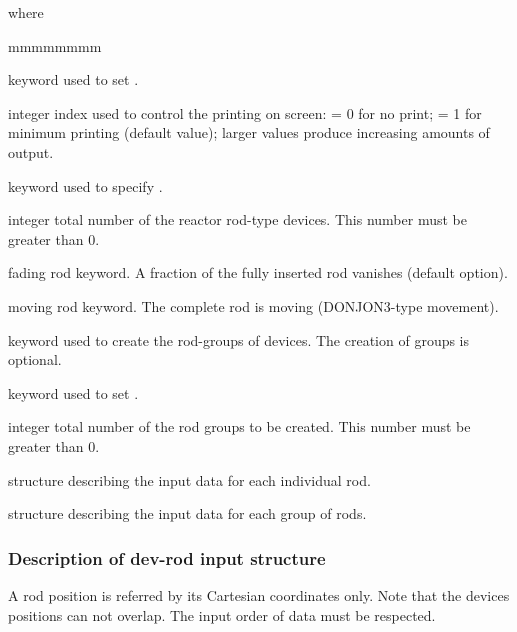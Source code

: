 \noindent where
\begin{ListeDeDescription}{mmmmmmmm}

\item[\moc{EDIT}] keyword used to set .

\item[\dusa{iprint}] integer index used to control the printing on screen:
= 0 for no print; = 1 for minimum printing (default value); larger values
produce increasing amounts of output.

\item[\moc{NUM-ROD}] keyword used to specify .

\item[\dusa{nrod}] integer total number of the reactor rod-type devices.
This number must be greater than 0.

\item[\moc{FADE}] fading rod keyword. A fraction of the fully inserted rod vanishes (default option).

\item[\moc{MOVE}] moving rod keyword. The complete rod is moving (DONJON3-type movement).

\item[\moc{CREATE}] keyword used to create the rod-groups of devices.
The creation of groups is optional.

\item[\moc{ROD-GR}] keyword used to set .

\item[\dusa{ngrp}] integer total number of the rod groups to be created.
This number must be greater than 0.

\item[\dstr{dev-rod}] structure describing the input data for each individual rod.
 
\item[\dstr{rod-group}] structure describing the input data for each group of rods.

\end{ListeDeDescription}

\vskip 0.2cm

\subsubsection{Description of dev-rod input structure}\label{sect:devrodstr}

A rod position is referred by its  Cartesian coordinates only.
Note that the devices positions can not overlap. The input order of data
must be respected.

